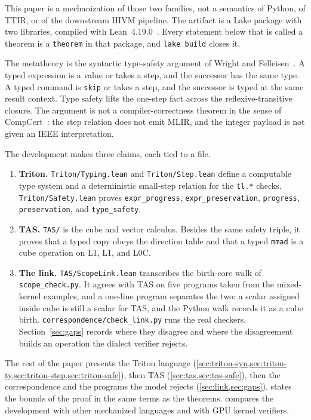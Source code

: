 \documentclass[a4paper,UKenglish,anonymous,cleveref,autoref]{lipics-v2021}
\begin{document}
This paper is a mechanization of those two families, not a semantics of Python, of TTIR, or of the downstream HIVM pipeline.
The artifact is a Lake package with two libraries, compiled with Lean~4.19.0~\cite{demoura2021lean}.
Every statement below that is called a theorem is a \texttt{theorem} in that package, and \texttt{lake build} closes it.

The metatheory is the syntactic type-safety argument of Wright and Felleisen~\cite{wright1994syntactic,pierce2002tapl}.
A typed expression is a value or takes a step, and the successor has the same type.
A typed command is \texttt{skip} or takes a step, and the successor is typed at the same result context.
Type safety lifts the one-step fact across the reflexive-transitive closure.
The argument is not a compiler-correctness theorem in the sense of CompCert~\cite{leroy2009compcert}: the step relation does not emit MLIR, and the integer payload is not given an IEEE interpretation.

The development makes three claims, each tied to a file.
\begin{enumerate}
\item \textbf{Triton.}
\texttt{Triton/Typing.lean} and \texttt{Triton/Step.lean} define a computable type system and a deterministic small-step relation for the \texttt{tl.*} checks.
\texttt{Triton/Safety.lean} proves \texttt{expr\_progress}, \texttt{expr\_preservation}, \texttt{progress}, \texttt{preservation}, and \texttt{type\_safety}.
\item \textbf{TAS.}
\texttt{TAS/} is the cube and vector calculus.
Besides the same safety triple, it proves that a typed copy obeys the direction table and that a typed \texttt{mmad} is a cube operation on L1, L1, and L0C.
\item \textbf{The link.}
\texttt{TAS/ScopeLink.lean} transcribes the birth-core walk of \texttt{scope\_check.py}.
It agrees with TAS on five programs taken from the mixed-kernel examples, and a one-line program separates the two: a scalar assigned inside cube is still a scalar for TAS, and the Python walk records it as a cube birth.
\texttt{correspondence/check\_link.py} runs the real checkers.
Section~\ref{sec:gaps} records where they disagree and where the disagreement builds an operation the dialect verifier rejects.
\end{enumerate}

The rest of the paper presents the Triton language (\cref{sec:triton-syn,sec:triton-ty,sec:triton-step,sec:triton-safe}), then TAS (\cref{sec:tas,sec:tas-safe}), then the correspondence and the programs the model rejects (\cref{sec:link,sec:gaps}).
 states the bounds of the proof in the same terms as the theorems.
 compares the development with other mechanized languages and with GPU kernel verifiers.
\end{document}
